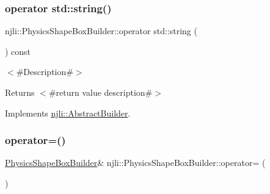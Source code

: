 \subsubsection{\texorpdfstring{operator std\+::string()}{operator std::string()}}
{\footnotesize\ttfamily njli\+::\+Physics\+Shape\+Box\+Builder\+::operator std\+::string (\begin{DoxyParamCaption}{ }\end{DoxyParamCaption}) const\hspace{0.3cm}{\ttfamily [virtual]}}

$<$\#\+Description\#$>$

\begin{DoxyReturn}{Returns}
$<$\#return value description\#$>$ 
\end{DoxyReturn}


Implements \mbox{\hyperlink{classnjli_1_1_abstract_builder_a3e6e553e06d1ca30517ad5fb0bd4d000}{njli\+::\+Abstract\+Builder}}.

\mbox{\label{classnjli_1_1_physics_shape_box_builder_adc89f620bf76da820746cfb1f5d7df53}} 
\subsubsection{\texorpdfstring{operator=()}{operator=()}}
{\footnotesize\ttfamily \mbox{\hyperlink{classnjli_1_1_physics_shape_box_builder}{Physics\+Shape\+Box\+Builder}}\& njli\+::\+Physics\+Shape\+Box\+Builder\+::operator= (\begin{DoxyParamCaption}\item[{const \mbox{\hyperlink{classnjli_1_1_physics_shape_box_builder}{Physics\+Shape\+Box\+Builder}} \&}]{ }\end{DoxyParamCaption})\hspace{0.3cm}{\ttfamily [protected]}}

\mbox{\label{classnjli_1_1_physics_shape_box_builder_a7f70d7647631101be450c593dfc3553a}} 
